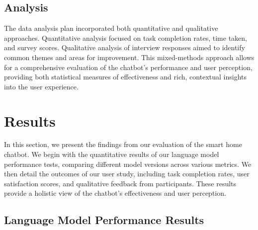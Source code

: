 \subsection{Analysis}
The data analysis plan incorporated both quantitative and qualitative approaches. Quantitative analysis focused on task completion rates, time taken, and survey scores. Qualitative analysis of interview responses aimed to identify common themes and areas for improvement. This mixed-methods approach allows for a comprehensive evaluation of the chatbot's performance and user perception, providing both statistical measures of effectiveness and rich, contextual insights into the user experience.


\section{Results}
In this section, we present the findings from our evaluation of the smart home chatbot. We begin with the quantitative results of our language model performance tests, comparing different model versions across various metrics. We then detail the outcomes of our user study, including task completion rates, user satisfaction scores, and qualitative feedback from participants. These results provide a holistic view of the chatbot's effectiveness and user perception.

\subsection{Language Model Performance Results}

\begin{table}[ht]
    \centering
    \caption{Descriptive Statistics and Analysis of the semantic similarity and performance metrics for the different llama3 models created.}
    \label{tab:descr-model}
\end{table}

